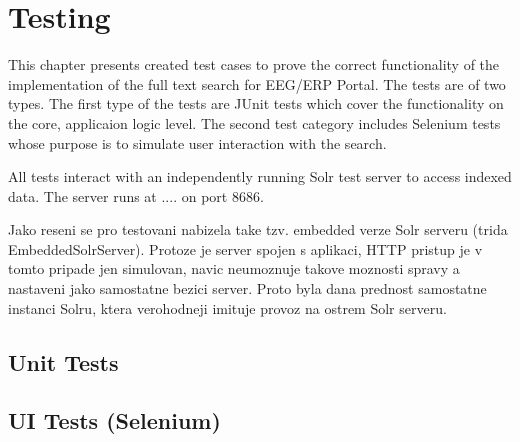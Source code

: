 \chapter{Testing}

This chapter presents created test cases to prove the correct functionality of the implementation of the full text search for EEG/ERP Portal. The tests are of two types. The first type of the tests are JUnit tests which cover the functionality on the core, applicaion logic level. The second test category includes Selenium tests whose purpose is to simulate user interaction with the search.

All tests interact with an independently running Solr test server to access indexed data. The server runs at .... on port 8686.

Jako reseni se pro testovani nabizela
take tzv. embedded verze Solr serveru (trida EmbeddedSolrServer).
Protoze je server spojen s aplikaci, HTTP pristup je v tomto pripade
jen simulovan, navic neumoznuje takove moznosti spravy a nastaveni
jako samostatne bezici server. Proto byla dana prednost
samostatne instanci Solru, ktera verohodneji imituje provoz
na ostrem Solr serveru.


\section{Unit Tests}


\section{UI Tests (Selenium)}

